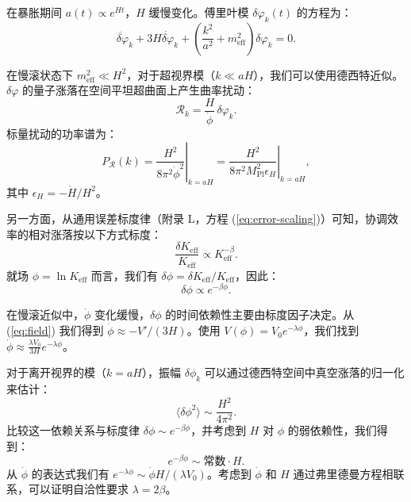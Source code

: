 \documentclass[12pt]{article}
\theoremstyle{remark}
\newcommand{\Keff}{K_{\mathrm{eff}}}
\newcommand{\Mpl}{M_{\mathrm{Pl}}}
\begin{document}
	在暴胀期间 $a(t) \propto e^{Ht}$，$H$ 缓慢变化。傅里叶模 $\delta\varphi_k(t)$ 的方程为：
	\begin{equation}
		\ddot{\delta\varphi}_k + 3H\dot{\delta\varphi}_k + \left( \frac{k^2}{a^2} + m_{\mathrm{eff}}^2 \right) \delta\varphi_k = 0.
	\end{equation}
	
	在慢滚状态下 $m_{\mathrm{eff}}^2 \ll H^2$，对于超视界模（$k \ll aH$），我们可以使用德西特近似。$\delta\varphi$ 的量子涨落在空间平坦超曲面上产生曲率扰动：
	\begin{equation}
		\mathcal{R}_k = \frac{H}{\dot{\phi}} \, \delta\varphi_k.
	\end{equation}
	标量扰动的功率谱为：
	\begin{equation}
		P_{\mathcal{R}}(k) = \left. \frac{H^2}{8\pi^2 \dot{\phi}^2} \right|_{k=aH} = \left. \frac{H^2}{8\pi^2 \Mpl^2 \epsilon_H} \right|_{k=aH},
	\end{equation}
	其中 $\epsilon_H = -\dot{H}/H^2$。
	
	另一方面，从通用误差标度律（附录 L，方程 (\ref{eq:error-scaling})）可知，协调效率的相对涨落按以下方式标度：
	\begin{equation}
		\frac{\delta\Keff}{\Keff} \propto \Keff^{-\beta}.
	\end{equation}
	就场 $\phi = \ln\Keff$ 而言，我们有 $\delta\phi = \delta\Keff/\Keff$，因此：
	\begin{equation}
		\delta\phi \propto e^{-\beta\phi}.
	\end{equation}
	
	在慢滚近似中，$\dot{\phi}$ 变化缓慢，$\delta\phi$ 的时间依赖性主要由标度因子决定。从 (\ref{eq:field}) 我们得到 $\dot{\phi} \approx -V'/(3H)$。使用 $V(\phi) = V_0 e^{-\lambda\phi}$，我们找到 $\dot{\phi} \approx \frac{\lambda V_0}{3H} e^{-\lambda\phi}$。
	
	对于离开视界的模（$k = aH$），振幅 $\delta\phi_k$ 可以通过德西特空间中真空涨落的归一化来估计：
	\begin{equation}
		\langle \delta\phi^2 \rangle \sim \frac{H^2}{4\pi^2}.
	\end{equation}
	比较这一依赖关系与标度律 $\delta\phi \sim e^{-\beta\phi}$，并考虑到 $H$ 对 $\phi$ 的弱依赖性，我们得到：
	\begin{equation}
		e^{-\beta\phi} \sim \text{常数} \cdot H.
	\end{equation}
	从 $\dot{\phi}$ 的表达式我们有 $e^{-\lambda\phi} \sim \dot{\phi} H / (\lambda V_0)$。考虑到 $\dot{\phi}$ 和 $H$ 通过弗里德曼方程相联系，可以证明自洽性要求 $\lambda = 2\beta$。
	
\end{document}
